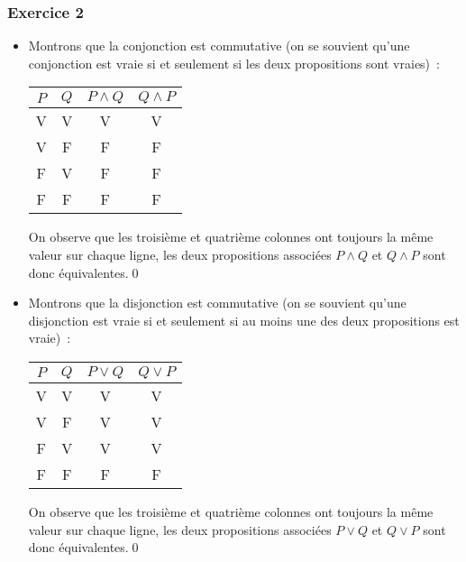 \documentclass[10pt,notheorems]{beamer}
\theoremstyle{plain}
\theoremstyle{definition} %
\begin{document}
\begin{frame}
  \frametitle{Exercice 2}
  \fontsize{8}{10}\selectfont

  \begin{itemize}
    
  \item Montrons que la conjonction est commutative (on se souvient qu'une conjonction est vraie si et seulement si les deux propositions sont vraies)~:
    \begin{table}[H]
      \centering
      \begin{tabular}[H]{|cc|cc|}
        \hline
        $P$ & $Q$ & $P \land Q$ & $Q \land P$\\ \hline
        V & V & V & V\\
        V & F & F & F\\
        F & V & F & F\\
        F & F & F & F \\
        \hline\hline
      \end{tabular}
    \end{table}
    On observe que les troisième et quatrième colonnes ont toujours
    la même valeur sur chaque ligne, les deux propositions associées
    $P \land Q$ et $Q \land P$ sont donc équivalentes.\qed\newline

    \item Montrons que la disjonction est commutative (on se souvient qu'une disjonction est vraie si et seulement si au moins une des deux propositions est vraie)~:
    \begin{table}[H]
      \centering
      \begin{tabular}[H]{|cc|cc|}
        \hline
        $P$ & $Q$ & $P \lor Q$ & $Q \lor P$\\ \hline
        V & V & V & V\\
        V & F & V & V\\
        F & V & V & V\\
        F & F & F & F \\
        \hline\hline
      \end{tabular}
    \end{table}
    On observe que les troisième et quatrième colonnes ont toujours
    la même valeur sur chaque ligne, les deux propositions associées
    $P \lor Q$ et $Q \lor P$ sont donc équivalentes.\qed\newline
    
  \end{itemize}
  
\end{frame}
\end{document}
